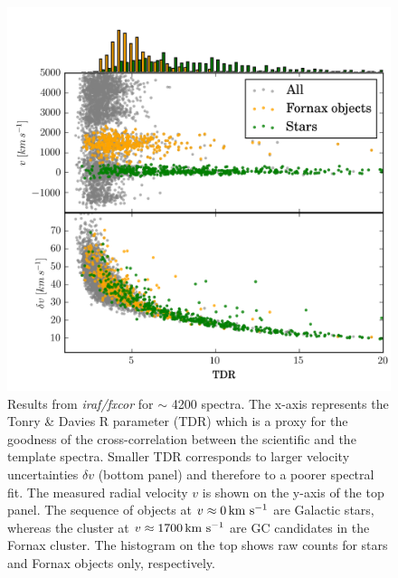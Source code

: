 \documentclass[useAMS,usenatbib]{mn2e}
\newcommand{\kms}{\mbox{\,km~s$^{-1}$}}
\begin{document}
\begin{figure}
\centering
\includegraphics[width=\columnwidth]{figures/fxcor_subplot.png} 
\caption{Results from {\it iraf/fxcor} for $\sim$ 4200 spectra. The x-axis represents the Tonry \& Davies R parameter (TDR) which is a proxy for the goodness of the cross-correlation between the scientific and the template spectra. Smaller TDR corresponds to larger velocity uncertainties $\delta v$ (bottom panel) and therefore to a poorer spectral fit. The measured radial velocity $v$ is shown on the y-axis of the top panel. The sequence of objects at $v\approx 0 \kms$ are Galactic stars, whereas the cluster at $v\approx1700\kms$ are GC candidates in the Fornax cluster. The histogram on the top shows raw counts for stars and Fornax objects only, respectively. }
\label{fig:tdr}
\end{figure}
\end{document}
